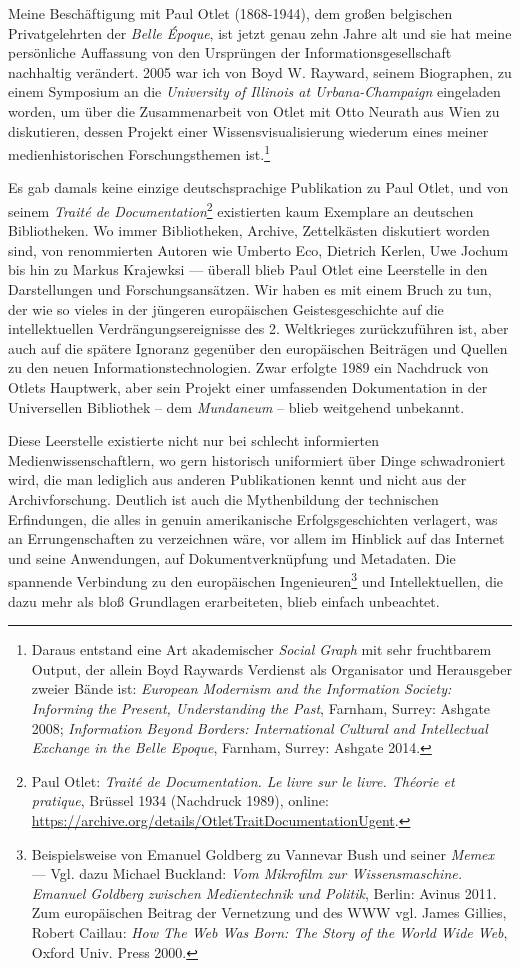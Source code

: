 Meine Beschäftigung mit Paul Otlet (1868-1944), dem großen belgischen
Privatgelehrten der \emph{Belle Époque}, ist jetzt genau zehn Jahre alt
und sie hat meine persönliche Auffassung von den Ursprüngen der
Informationsgesellschaft nachhaltig verändert. 2005 war ich von Boyd W.
Rayward, seinem Biographen, zu einem Symposium an die \emph{University
of Illinois at Urbana-Champaign} eingeladen worden, um über die
Zusammenarbeit von Otlet mit Otto Neurath aus Wien zu diskutieren,
dessen Projekt einer Wissensvisualisierung wiederum eines meiner
medienhistorischen Forschungsthemen ist.\footnote{Daraus entstand eine
  Art akademischer \emph{Social Graph} mit sehr fruchtbarem Output, der
  allein Boyd Raywards Verdienst als Organisator und Herausgeber zweier
  Bände ist: \emph{European Modernism and the Information Society:
  Informing the Present, Understanding the Past}, Farnham, Surrey:
  Ashgate 2008; \emph{Information Beyond Borders: International Cultural
  and Intellectual Exchange in the Belle Epoque}, Farnham, Surrey:
  Ashgate 2014.}

Es gab damals keine einzige deutschsprachige Publikation zu Paul Otlet,
und von seinem \emph{Traité de Documentation}\footnote{Paul Otlet:
  \emph{Traité de Documentation. Le livre sur le livre. Théorie et
  pratique}, Brüssel 1934 (Nachdruck 1989), online:
  \url{https://archive.org/details/OtletTraitDocumentationUgent}.}
existierten kaum Exemplare an deutschen Bibliotheken. Wo immer
Bibliotheken, Archive, Zettelkästen diskutiert worden sind, von
renommierten Autoren wie Umberto Eco, Dietrich Kerlen, Uwe Jochum bis
hin zu Markus Krajewksi --- überall blieb Paul Otlet eine Leerstelle in
den Darstellungen und Forschungsansätzen. Wir haben es mit einem Bruch
zu tun, der wie so vieles in der jüngeren europäischen Geistesgeschichte
auf die intellektuellen Verdrängungsereignisse des 2. Weltkrieges
zurückzuführen ist, aber auch auf die spätere Ignoranz gegenüber den
europäischen Beiträgen und Quellen zu den neuen
Informationstechnologien. Zwar erfolgte 1989 ein Nachdruck von Otlets
Hauptwerk, aber sein Projekt einer umfassenden Dokumentation in der
Universellen Bibliothek -- dem \emph{Mundaneum} -- blieb weitgehend
unbekannt.

Diese Leerstelle existierte nicht nur bei schlecht informierten
Medienwissenschaftlern, wo gern historisch uniformiert über Dinge
schwadroniert wird, die man lediglich aus anderen Publikationen kennt
und nicht aus der Archivforschung. Deutlich ist auch die Mythenbildung
der technischen Erfindungen, die alles in genuin amerikanische
Erfolgsgeschichten verlagert, was an Errungenschaften zu verzeichnen
wäre, vor allem im Hinblick auf das Internet und seine Anwendungen, auf
Dokumentverknüpfung und Metadaten. Die spannende Verbindung zu den
europäischen Ingenieuren\footnote{Beispielsweise von Emanuel Goldberg zu
  Vannevar Bush und seiner \emph{Memex} --- Vgl. dazu Michael Buckland:
  \emph{Vom Mikrofilm zur Wissensmaschine. Emanuel Goldberg zwischen
  Medientechnik und Politik}, Berlin: Avinus 2011. Zum europäischen
  Beitrag der Vernetzung und des WWW vgl. James Gillies, Robert Caillau:
  \emph{How The Web Was Born: The Story of the World Wide Web}, Oxford
  Univ. Press 2000.} und Intellektuellen, die dazu mehr als bloß
Grundlagen erarbeiteten, blieb einfach unbeachtet.

